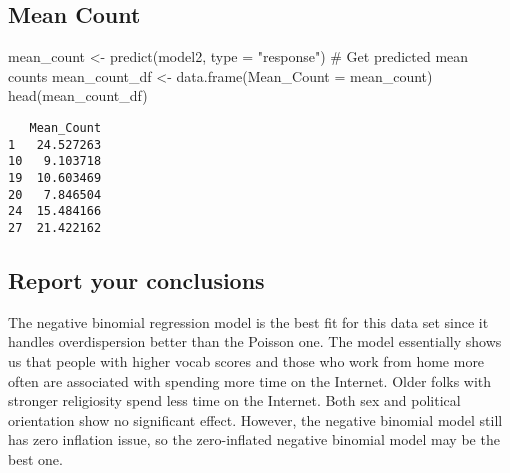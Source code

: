 \documentclass[
  letterpaper,
  DIV=11,
  numbers=noendperiod]{scrartcl}
\newenvironment{Shaded}{\begin{snugshade}}{\end{snugshade}}
\newcommand{\AttributeTok}[1]{\textcolor[rgb]{0.40,0.45,0.13}{#1}}
\newcommand{\CommentTok}[1]{\textcolor[rgb]{0.37,0.37,0.37}{#1}}
\newcommand{\FunctionTok}[1]{\textcolor[rgb]{0.28,0.35,0.67}{#1}}
\newcommand{\NormalTok}[1]{\textcolor[rgb]{0.00,0.23,0.31}{#1}}
\newcommand{\OtherTok}[1]{\textcolor[rgb]{0.00,0.23,0.31}{#1}}
\newcommand{\StringTok}[1]{\textcolor[rgb]{0.13,0.47,0.30}{#1}}
\begin{document}
\subsection{Mean Count}

\begin{Shaded}
\begin{Highlighting}[]
\NormalTok{mean\_count }\OtherTok{\textless{}{-}} \FunctionTok{predict}\NormalTok{(model2, }\AttributeTok{type =} \StringTok{"response"}\NormalTok{)  }\CommentTok{\# Get predicted mean counts}
\NormalTok{mean\_count\_df }\OtherTok{\textless{}{-}} \FunctionTok{data.frame}\NormalTok{(}\AttributeTok{Mean\_Count =}\NormalTok{ mean\_count)}
\FunctionTok{head}\NormalTok{(mean\_count\_df)}
\end{Highlighting}
\end{Shaded}

\begin{verbatim}
   Mean_Count
1   24.527263
10   9.103718
19  10.603469
20   7.846504
24  15.484166
27  21.422162
\end{verbatim}

\subsection{Report your conclusions}\label{report-your-conclusions}

The negative binomial regression model is the best fit for this data set
since it handles overdispersion better than the Poisson one. The model
essentially shows us that people with higher vocab scores and those who
work from home more often are associated with spending more time on the
Internet. Older folks with stronger religiosity spend less time on the
Internet. Both sex and political orientation show no significant effect.
However, the negative binomial model still has zero inflation issue, so
the zero-inflated negative binomial model may be the best one.
\end{document}
